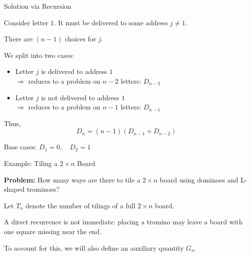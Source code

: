 \begin{frame}{Solution via Recursion}

Consider letter $1$. It must be delivered to some address $j \neq 1$.

\medskip

There are $(n-1)$ choices for $j$.

\medskip

We split into two cases:
\begin{itemize}
    \item[(1)] Letter $j$ is delivered to address $1$ \\
    $\Rightarrow$ reduces to a problem on $n-2$ letters: $D_{n-2}$

    \medskip

    \item[(2)] Letter $j$ is not delivered to address $1$ \\
    $\Rightarrow$ reduces to a problem on $n-1$ letters: $D_{n-1}$
\end{itemize}

\medskip

Thus,
\[
D_n = (n-1)(D_{n-1} + D_{n-2})
\]

\medskip

Base cases: $D_1 = 0, \quad D_2 = 1$

\end{frame}

\begin{frame}{Example: Tiling a \(2\times n\) Board}

\textcolor{sqt-question}{
\textbf{Problem:} How many ways are there to tile a \(2\times n\) board using
dominoes and L-shaped trominoes?
}

\medskip

Let \(T_n\) denote the number of tilings of a full \(2\times n\) board.

\medskip

A direct recurrence is not immediate: placing a tromino may leave a board
with one square missing near the end.

\medskip

To account for this, we will also define an auxiliary quantity \(G_n\).

\end{frame}

